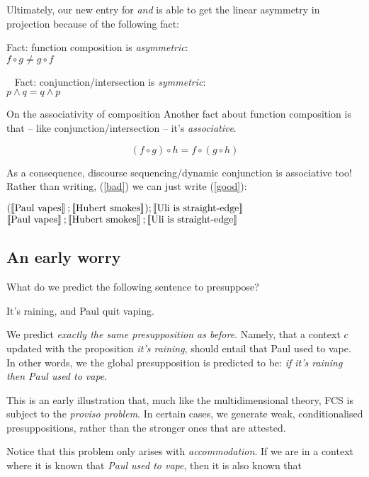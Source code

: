 \documentclass[cronos,landscape,paper=letter]{ling-handout}
\begin{document}
  Ultimately, our new entry for \textit{and} is able to get the linear asymmetry in projection because of the following fact:


  \ex Fact: function composition is \textit{asymmetric}:\\
  \(f∘g ≠ g∘f\)
  \xe

  \ex~ Fact: conjunction/intersection is \textit{symmetric}:\\
  \(p ∧ q = q ∧ p\)
  \xe

  \begin{tcolorbox}
    On the associativity of composition
    \tcblower
    Another fact about function composition is that -- like conjunction/intersection -- it's \textit{associative}.

    \[(f∘g)∘h = f∘(g∘h)\]

    As a consequence, discourse sequencing/dynamic conjunction is associative too! Rather than writing, (\ref{bad}) we can just write (\ref{good}):

    \pex
    \a\label{bad}\((\eval{Paul vapes};\eval{Hubert smokes});\eval{Uli is straight-edge}\)
    \a\label{good}\(\eval{Paul vapes};\eval{Hubert smokes};\eval{Uli is straight-edge}\)
    \xe

  \end{tcolorbox}

  \subsection{An early worry}

  What do we predict the following sentence to presuppose?

  \ex
  It's raining, and Paul quit vaping.
  \xe

  We predict \textit{exactly the same presupposition as before}. Namely, that a context \(c\) updated with the proposition \textit{it's raining}, should entail that Paul used to vape. In other words, we the global presupposition is predicted to be: \textit{if it's raining then Paul used to vape}.

  This is an early illustration that, much like the multidimensional theory, FCS is subject to the \textit{proviso problem}. In certain cases, we generate weak, conditionalised presuppositions, rather than the stronger ones that are attested.

  Notice that this problem only arises with \textit{accommodation}. If we are in a context where it is known that \textit{Paul used to vape}, then it is also known that 
\end{document}
